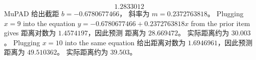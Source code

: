 \begin{exercises}
\begin{answer}
\begin{exparts}
\begin{equation*}
{                           1.2833012}
            \end{equation*}
            MuPAD 给出截距 $b= -0.6780677466$，
            斜率为 $m=0.2372763818$。
          \partsitem Plugging $x=9$ into the equation
            $y= -0.6780677466+0.2372763818x$ from the prior item gives
            距离对数为 $1.4574197$，因此预测
            距离为 $28.669472$。
            实际距离约为 $30.003$。
          \partsitem Plugging $x=10$ into the same equation
            给出距离对数为 $1.6946961$，因此预测
            距离为 $49.510362$。
            实际距离约为 $39.503$。
        \end{exparts}
      \end{answer}

\end{exercises}
